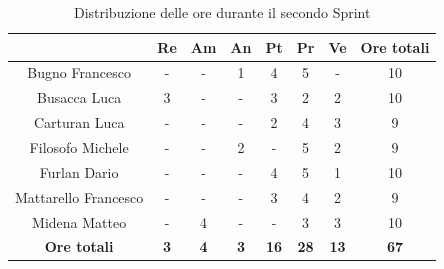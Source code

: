 \begin{table}[H]
  \centering
  \renewcommand{\arraystretch}{1.8}
  \begin{tabular}{c|c|c|c|c|c|c|c}
    \rowcolor[HTML]{125E28}
    \multicolumn{1}{c}{\color[HTML]{FFFFFF}\textbf{ Nominativo }}
                         & \multicolumn{1}{c}{\color[HTML]{FFFFFF}\textbf{ Re }}
                         & \multicolumn{1}{c}{\color[HTML]{FFFFFF}\textbf{ Am}}
                         & \multicolumn{1}{c}{\color[HTML]{FFFFFF}\textbf{ An }}
                         & \multicolumn{1}{c}{\color[HTML]{FFFFFF}\textbf{ Pt }}
                         & \multicolumn{1}{c}{\color[HTML]{FFFFFF}\textbf{ Pr }}
                         & \multicolumn{1}{c}{\color[HTML]{FFFFFF}\textbf{ Ve }}
                         & \multicolumn{1}{c}{\color[HTML]{FFFFFF}\textbf{ Ore totali }}                                                                                   \\
    \hline
    Bugno Francesco      & -                                                             & -          & 1          & 4           & 5           & -           & 10          \\
    Busacca Luca         & 3                                                             & -          & -          & 3           & 2           & 2           & 10          \\
    Carturan Luca        & -                                                             & -          & -          & 2           & 4           & 3           & 9           \\
    Filosofo Michele     & -                                                             & -          & 2          & -           & 5           & 2           & 9           \\
    Furlan Dario         & -                                                             & -          & -          & 4           & 5           & 1           & 10          \\
    Mattarello Francesco & -                                                             & -          & -          & 3           & 4           & 2           & 9           \\
    Midena Matteo        & -                                                             & 4          & -          & -           & 3           & 3           & 10          \\
    \textbf{Ore totali}  & \textbf{3}                                                    & \textbf{4} & \textbf{3} & \textbf{16} & \textbf{28} & \textbf{13} & \textbf{67}
  \end{tabular}
  \caption{Distribuzione delle ore durante il secondo Sprint}
\end{table}

